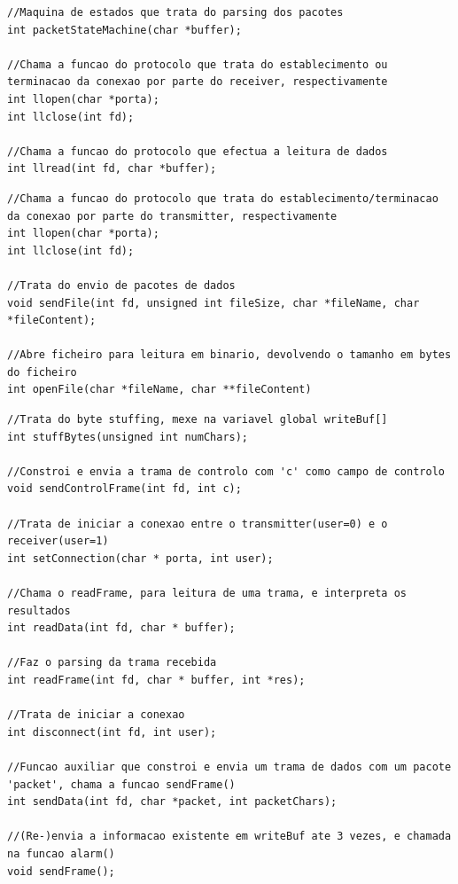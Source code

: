 \documentclass[a4paper,11pt]{article}
\begin{document}
\begin{lstlisting}
//Maquina de estados que trata do parsing dos pacotes
int packetStateMachine(char *buffer);  

//Chama a funcao do protocolo que trata do establecimento ou terminacao da conexao por parte do receiver, respectivamente
int llopen(char *porta); 
int llclose(int fd); 

//Chama a funcao do protocolo que efectua a leitura de dados
int llread(int fd, char *buffer);  
\end{lstlisting}

\lstset{language=C,
		showstringspaces=false,
		frame=tb,
		caption=Write.h}
\begin{lstlisting}
//Chama a funcao do protocolo que trata do establecimento/terminacao da conexao por parte do transmitter, respectivamente
int llopen(char *porta);
int llclose(int fd);

//Trata do envio de pacotes de dados
void sendFile(int fd, unsigned int fileSize, char *fileName, char *fileContent);

//Abre ficheiro para leitura em binario, devolvendo o tamanho em bytes do ficheiro
int openFile(char *fileName, char **fileContent) 
\end{lstlisting}

\lstset{language=C,
		showstringspaces=false,
		frame=tb,
		caption=Protocol.h}
\begin{lstlisting}
//Trata do byte stuffing, mexe na variavel global writeBuf[]
int stuffBytes(unsigned int numChars);

//Constroi e envia a trama de controlo com 'c' como campo de controlo
void sendControlFrame(int fd, int c);

//Trata de iniciar a conexao entre o transmitter(user=0) e o receiver(user=1)
int setConnection(char * porta, int user);

//Chama o readFrame, para leitura de uma trama, e interpreta os resultados 	
int readData(int fd, char * buffer);

//Faz o parsing da trama recebida
int readFrame(int fd, char * buffer, int *res);

//Trata de iniciar a conexao
int disconnect(int fd, int user);

//Funcao auxiliar que constroi e envia um trama de dados com um pacote 'packet', chama a funcao sendFrame()
int sendData(int fd, char *packet, int packetChars);

//(Re-)envia a informacao existente em writeBuf ate 3 vezes, e chamada na funcao alarm() 
void sendFrame();
\end{lstlisting}
\end{document}
